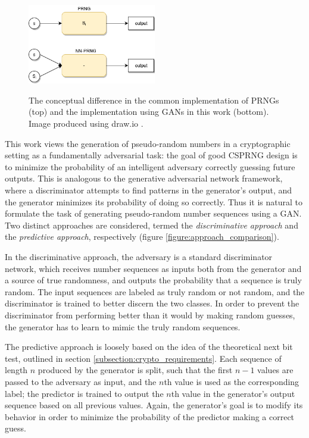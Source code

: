 \documentclass[12pt, titlepage]{report}
\theoremstyle{definition}
\begin{document}
\begin{figure}
\centering
\includegraphics[width=0.5\textwidth]{img/conceptual_design.png}\\
\caption[PRNG black box vs. neural network PRNG black box]{The conceptual difference in the common implementation of PRNGs (top) and the implementation using GANs in this work (bottom). Image produced using draw.io \cite{jgraph2018draw}.}
\label{figure:conceptual_difference}
\end{figure}

This work views the generation of pseudo-random numbers in a cryptographic setting as a fundamentally adversarial task: the goal of good CSPRNG design is to minimize the probability of an intelligent adversary correctly guessing future outputs. This is analogous to the generative adversarial network framework, where a discriminator attempts to find patterns in the generator's output, and the generator minimizes its probability of doing so correctly. Thus it is natural to formulate the task of generating pseudo-random number sequences using a GAN. Two distinct approaches are considered, termed the \textit{discriminative approach} and the \textit{predictive approach}, respectively (figure \ref{figure:approach_comparison}). 

In the discriminative approach, the adversary is a standard discriminator network, which receives number sequences as inputs both from the generator and a source of true randomness, and outputs the probability that a sequence is truly random. The input sequences are labeled as truly random or not random, and the discriminator is trained to better discern the two classes. In order to prevent the discriminator from performing better than it would by making random guesses, the generator has to learn to mimic the truly random sequences.

The predictive approach is loosely based on the idea of the theoretical next bit test, outlined in section \ref{subsection:crypto_requirements}. Each sequence of length $n$ produced by the generator is split, such that the first $n - 1$ values are passed to the adversary as input, and the $n$th value is used as the corresponding label; the predictor is trained to output the $n$th value in the generator's output sequence based on all previous values. Again, the generator's goal is to modify its behavior in order to minimize the probability of the predictor making a correct guess.
\end{document}
